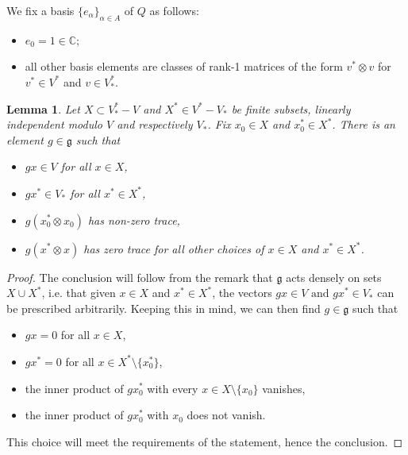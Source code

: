 \documentclass[11pt]{article}
\theoremstyle{plain}
\newtheorem{lemma}{Lemma}[section]
\theoremstyle{nonumberplain}
\theoremstyle{plain}
\numberwithin{equation}{section}
\theoremstyle{nonumberplain}
\newtheorem{proof}{Proof}
\newcommand\bC{{\mathbb C}}
\newcommand\fg{{\mathfrak g}}
\newcommand\1{{\bf 1}}
\begin{document}
We fix a basis $\{e_{\alpha}\}_{\alpha\in A}$ of $Q$ as follows: 

\begin{itemize}
\item[$-$] $e_0=1\in \bC$;
\item[$-$] all other basis elements are classes of rank-1 matrices of the form $v^* \otimes  v $ for $v^*\in V^*$ and   $v\in V^*_*$.   
\end{itemize}


\begin{lemma}\label{le.prscr-ann}
  Let $X\subset V_*^*-V$ and $X^*\in V^*-V_*$ be finite subsets, linearly independent modulo $V$ and respectively $V_*$. Fix $x_0\in X$ and $x_0^*\in X^*$. There is an element $g\in \fg$ such that
  \begin{itemize}
  \item[$-$] $gx\in V$ for all $x\in X$,   
  \item[$-$] $gx^*\in V_*$ for all $x^*\in X^*$,
  \item[$-$] $g(  x_0^* \otimes  x_0)$ has non-zero trace,
  \item[$-$] $g(x^*\otimes x )$ has zero trace for all other choices of $x\in X$ and $x^*\in X^*$.
  \end{itemize}
\end{lemma}
\begin{proof}
  The conclusion will follow from the remark that $\fg$ acts densely on sets $X\cup X^*$, i.e. that given $x\in X$ and $x^*\in X^*$, the vectors $gx\in V \text{ and }gx^* \in V_*$ can be prescribed arbitrarily. Keeping this in mind, we can then find $g\in \fg$ such that
  \begin{itemize}
  \item[$-$] $gx=0$ for all $x\in X$, 
  \item[$-$] $gx^*=0$ for all $x\in X^*\setminus\{x_0^*\}$, 
  \item[$-$] the inner product of $gx_0^*$ with every $x\in X\setminus\{x_0\}$ vanishes, 
  \item[$-$] the inner product of $gx_0^*$ with $x_0$ does not vanish.
  \end{itemize}
  This choice will meet the requirements of the statement, hence the conclusion.
\end{proof}
\end{document}
